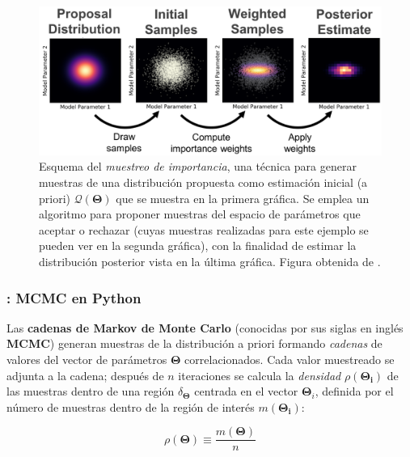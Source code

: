 \begin{figure}[!ht]
	\centering
	\includegraphics[scale=0.28]{Introduccion/Figures/Figura MCMC Pesos Muestreo.png}
	\caption{Esquema del \textit{muestreo de importancia}, una técnica para
	generar muestras de una distribución propuesta como estimación inicial (a
	priori) $\mathcal{Q}(\mathbf{\Theta})$ que se muestra en la primera gráfica.
	Se emplea un algoritmo para proponer muestras del espacio de parámetros que
	aceptar o rechazar (cuyas muestras realizadas para este ejemplo se pueden
	ver en la segunda gráfica), con la finalidad de estimar la distribución
	posterior vista en la última gráfica. Figura obtenida de
	.}
	\label{figuraMcmcMuestreoImportancia}
\end{figure}

\subsubsection{: MCMC en Python}

Las \textbf{cadenas de Markov de Monte Carlo} (conocidas por sus siglas en
inglés \textbf{MCMC}) generan muestras de la distribución a priori formando
\textit{cadenas} de valores del vector de parámetros $\mathbf{\Theta}$
correlacionados. Cada valor muestreado se adjunta a la cadena; después de $n$
iteraciones se calcula la \textit{densidad} $\rho(\mathbf{\Theta_i})$ de las
muestras dentro de una región $\delta_{\mathbf{\Theta}}$ centrada en el vector
$\mathbf{\Theta}_i$, definida por el número de muestras dentro de la región de
interés $m(\mathbf{\Theta_i})$:

\begin{eqfloat}[!ht]
	\centering
	\begin{equation}
		\rho(\mathbf{\Theta}) \equiv \frac{m(\mathbf{\Theta})}{n}
	\end{equation}
\end{eqfloat}

